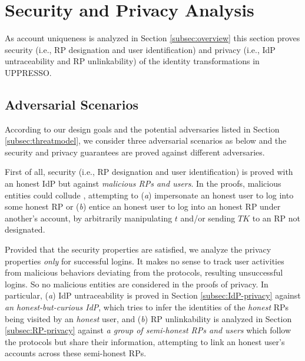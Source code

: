 \section{Security and Privacy Analysis}
\label{sec:analysis}

As account uniqueness is analyzed in Section \ref{subsec:overview}
this section proves security (i.e., RP designation and user identification) and privacy (i.e., IdP untraceability and RP unlinkability) of the identity transformations in UPPRESSO.


\subsection{Adversarial Scenarios}

According to our design goals %
 and the potential adversaries listed in Section \ref{subsec:threatmodel}, we consider three adversarial scenarios as below
 and the security and privacy guarantees are proved against different adversaries.


First of all, security (i.e., RP designation and user identification) is proved with an honest IdP but against \emph{malicious RPs and users}.
In the proofs, malicious entities could collude \cite{FettKS14,BrowserID,SPRESSO},
  attempting to (\emph{a}) impersonate an honest user to log into some honest RP
   or (\emph{b}) entice an honest user to log into an honest RP under another's account, 
by arbitrarily manipulating $t$ and/or sending $TK$ to an RP not designated.

Provided that the security properties are satisfied,
    we analyze the privacy properties \emph{only} for successful logins.
It makes no sense to track user activities
     from malicious behaviors deviating from the protocols, resulting unsuccessful logins.
So no malicious entities are considered in the proofs of privacy.
In particular, (\emph{a}) IdP untraceability is proved in Section \ref{subsec:IdP-privacy} against \emph{an honest-but-curious IdP}, which tries to infer the identities of the \emph{honest} RPs being visited by an \emph{honest} user,
and (\emph{b}) RP unlinkability is analyzed in Section \ref{subsec:RP-privacy} against \emph{a group of semi-honest RPs and users} which follow the protocols but share their information,
    attempting to link an honest user's accounts across these semi-honest RPs.

